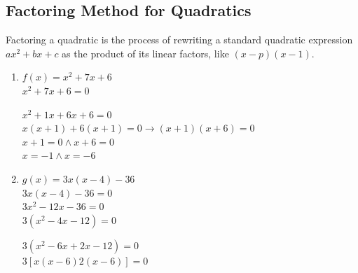 \subsection{Factoring Method for Quadratics}
\begin{definition}[Factoring]
  Factoring a quadratic is the process of rewriting a standard quadratic expression $ax^2 + bx + c$ as the product of its linear factors, like $(x - p)(x - 1)$.
\end{definition}
\begin{example}[Factoring]
  \hfill
  \begin{enumerate}
  \item $f(x) = x^2 + 7x + 6$ \\
    $x^2 + 7x + 6 = 0$ \\
    \begin{center}
    \end{center}
    $x^2 + 1x + 6x + 6 = 0$ \\
    $x(x + 1) + 6(x + 1) = 0 \to (x + 1)(x + 6) = 0$ \\
    $x + 1 = 0 \land x + 6 = 0$ \\
    $x = -1 \land x = -6$
  \item $g(x) = 3x(x - 4) - 36$ \\
    $3x(x - 4) - 36 = 0$ \\
    $3x^2 - 12x - 36 = 0$ \\
    $3(x^2 - 4x - 12) = 0$ \\
    \begin{center}
    \end{center}
    $3(x^2 - 6x + 2x - 12) = 0$ \\
    $3[x(x - 6) 2(x - 6)] = 0$ \\

\end{enumerate}
\end{example}
